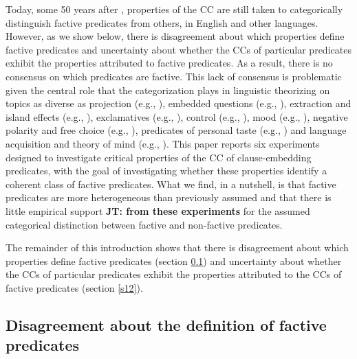 \documentclass[11pt,fleqn]{article}
\newcommand{\6}{\mbox{$[\hspace*{-.6mm}[$}}
\newcommand{\9}{\mbox{$]\hspace*{-.6mm}]$}}
\newcommand{\jt}[1]{\textbf{\color{blue}JT: #1}}
\begin{document}
Today, some 50 years after \citealt{kiparsky-kiparsky70}, properties of the CC are still taken to categorically distinguish factive predicates from others, in English and other languages. However, as we show below, there is disagreement about which properties define factive predicates and uncertainty about whether the CCs of particular predicates exhibit the properties attributed to factive predicates. As a result, there is no consensus on which predicates are factive. This lack of consensus is problematic given the central role that the categorization plays in linguistic theorizing on topics as diverse as projection (e.g., \citealt{karttunen-peters79,vds92}), embedded questions (e.g., \citealt{hintikka1975,guerzoni-sharvit2007,spector-egre2015}), extraction and island effects (e.g., \citealt{hukari-levine1995,rooryck2000,abrusan2014}), exclamatives (e.g., \citealt{zanuttini-portner2003}), control (e.g., \citealt{landau2001}), mood (e.g., \citealt{van-gelderen2004,givon95,heycock2006,giannakidou-mari2015}), negative polarity and free choice (e.g., \citealt{giannakidou1998,giannakidou2001}), predicates of personal taste (e.g., \citealt{lasersohn2009}) and language acquisition and theory of mind (e.g., \citealt{devillers2005}). This paper reports six experiments designed to investigate critical properties of the CC of clause-embedding predicates, with the goal of investigating whether these properties identify a coherent class of factive predicates. What we find, in a nutshell, is that factive predicates are more heterogeneous than previously assumed and that there is little empirical support \jt{from these experiments} for the assumed categorical distinction between factive and non-factive predicates.

The remainder of this introduction shows that there is disagreement about which properties define factive predicates (section \ref{s11}) and uncertainty about whether the CCs of particular predicates exhibit the properties attributed to the CCs of factive predicates (section \ref{s12}).




	
\subsection{Disagreement about the definition of factive predicates}\label{s11}

\end{document}
